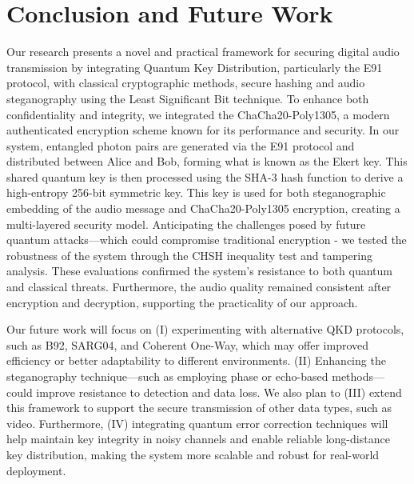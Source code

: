\documentclass[a4paper]{cas-sc}
\begin{document}
\section{Conclusion and Future Work}
\label{sec:conclusion}
Our research presents a novel and practical framework for securing digital audio transmission by integrating Quantum Key Distribution, particularly the E91 protocol, with classical cryptographic methods, secure hashing and audio steganography using the Least Significant Bit technique. To enhance both confidentiality and integrity, we integrated the ChaCha20-Poly1305, a modern authenticated encryption scheme known for its performance and security. In our system, entangled photon pairs are generated via the E91 protocol and distributed between Alice and Bob, forming what is known as the Ekert key. This shared quantum key is then processed using the SHA-3 hash function to derive a high-entropy 256-bit symmetric key. This key is used for both steganographic embedding of the audio message and ChaCha20-Poly1305 encryption, creating a multi-layered security model. Anticipating the challenges posed by future quantum attacks—which could compromise traditional encryption - we tested the robustness of the system through the CHSH inequality test and tampering analysis. These evaluations confirmed the system's resistance to both quantum and classical threats. Furthermore, the audio quality remained consistent after encryption and decryption, supporting the practicality of our approach.

Our future work will focus on (I) experimenting with alternative QKD protocols, such as B92, SARG04, and Coherent One-Way, which may offer improved efficiency or better adaptability to different environments.\cite{nurhadi2018quantum} (II) Enhancing the steganography technique—such as employing phase or echo-based methods—could improve resistance to detection and data loss. We also plan to (III) extend this framework to support the secure transmission of other data types, such as video. Furthermore, (IV) integrating quantum error correction techniques\cite{devitt2013quantum} will help maintain key integrity in noisy channels \cite{nagata2017quantum} and enable reliable long-distance key distribution, making the system more scalable and robust for real-world deployment.

\end{document}
